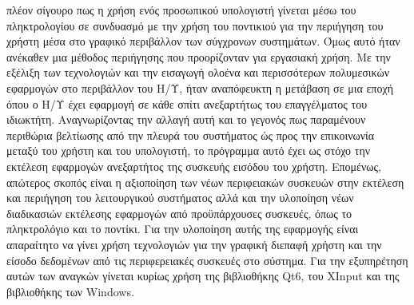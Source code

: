 



πλέον σίγουρο πως η χρήση ενός προσωπικού υπολογιστή γίνεται μέσω του
πληκτρολογίου σε συνδυασμό με την χρήση του ποντικιού για την περιήγηση του
χρήστη μέσα στο γραφικό περιβάλλον των σύγχρονων συστημάτων. Όμως αυτό ήταν
ανέκαθεν μια μέθοδος περιήγησης που προορίζονταν για εργασιακή χρήση. Με την
εξέλιξη των τεχνολογιών και την εισαγωγή ολοένα και περισσότερων πολυμεσικών
εφαρμογών στο περιβάλλον του Η/Υ, ήταν αναπόφευκτη η μετάβαση σε μια εποχή
όπου ο Η/Υ έχει εφαρμογή σε κάθε σπίτι ανεξαρτήτως του επαγγέλματος του
ιδιωκτήτη. Αναγνωρίζοντας την αλλαγή αυτή και το γεγονός πως παραμένουν
περιθώρια βελτίωσης από την πλευρά του συστήματος ώς προς την επικοινωνία
μεταξύ του χρήστη και του υπολογιστή, το πρόγραμμα αυτό έχει ως στόχο την
εκτέλεση εφαρμογών ανεξαρτήτος της συσκευής εισόδου του χρήστη. Επομένως,
απώτερος σκοπός είναι η αξιοποίηση των νέων περιφειακών συσκευών στην
εκτέλεση και περιήγηση του λειτουργικού συστήματος αλλά και την υλοποίηση
νέων διαδικασιών εκτέλεσης εφαρμογών από προϋπάρχουσες συσκευές, όπως το
πληκτρολόγιο και το ποντίκι. Για την υλοποίηση αυτής της εφαρμογής είναι
απαραίτητο να γίνει χρήση τεχνολογιών για την γραφική διεπαφή χρήστη και την
είσοδο δεδομένων από τις περιφερειακές συσκευές στο σύστημα. Για την
εξυπηρέτηση αυτών των αναγκών γίνεται κυρίως χρήση της βιβλιοθήκης Qt6, του
XInput και της βιβλιοθήκης των Windows.






